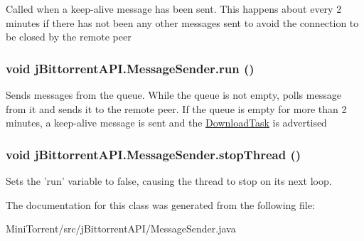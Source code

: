 \label{classj_bittorrent_a_p_i_1_1_message_sender_a21a7fc624fa156b056028a36bbf136f8}
Called when a keep-\/alive message has been sent. This happens about every 2 minutes if there has not been any other messages sent to avoid the connection to be closed by the remote peer \hypertarget{classj_bittorrent_a_p_i_1_1_message_sender_aa9773f42b5d477b971f1438e458aa5a5}{
\subsubsection[{run}]{\setlength{\rightskip}{0pt plus 5cm}void jBittorrentAPI.MessageSender.run ()}}
\label{classj_bittorrent_a_p_i_1_1_message_sender_aa9773f42b5d477b971f1438e458aa5a5}
Sends messages from the queue. While the queue is not empty, polls message from it and sends it to the remote peer. If the queue is empty for more than 2 minutes, a keep-\/alive message is sent and the \hyperlink{classj_bittorrent_a_p_i_1_1_download_task}{DownloadTask} is advertised \hypertarget{classj_bittorrent_a_p_i_1_1_message_sender_a8a81081eff1e8b940205a86b457d666b}{
\subsubsection[{stopThread}]{\setlength{\rightskip}{0pt plus 5cm}void jBittorrentAPI.MessageSender.stopThread ()}}
\label{classj_bittorrent_a_p_i_1_1_message_sender_a8a81081eff1e8b940205a86b457d666b}
Sets the 'run' variable to false, causing the thread to stop on its next loop. 

The documentation for this class was generated from the following file:\begin{DoxyCompactItemize}
\item 
MiniTorrent/src/jBittorrentAPI/MessageSender.java\end{DoxyCompactItemize}

